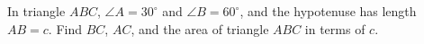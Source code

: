 In triangle $ABC$, $\angle A=30^\circ$ and $\angle B=60^\circ$, and the hypotenuse has length $AB=c$. Find $BC$, $AC$, and the area of triangle $ABC$ in terms of $c$.
